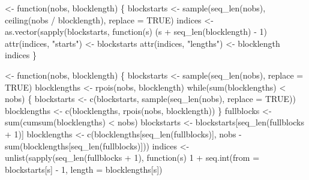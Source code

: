 \documentclass[10pt]{article}%
\begin{document}
 <- function(nobs, blocklength) \{
  blockstarts <- sample(seq_len(nobs), ceiling(nobs / blocklength), 
                        replace = TRUE)
  indices <- 
    as.vector(sapply(blockstarts, function(s)
                     (s + seq_len(blocklength) - 1) %
  attr(indices, "starts") <- blockstarts
  attr(indices, "lengths") <- blocklength
  indices
\}

 <- function(nobs, blocklength) \{
  blockstarts <- sample(seq_len(nobs), replace = TRUE) 
  blocklengths <- rpois(nobs, blocklength)
  while(sum(blocklengths) < nobs) \{
    blockstarts <- c(blockstarts, sample(seq_len(nobs), replace = TRUE))
    blocklengths <- c(blocklengths, rpois(nobs, blocklength))
  \}
  fullblocks <- sum(cumsum(blocklengths) < nobs)
  blockstarts <- blockstarts[seq_len(fullblocks + 1)]
  blocklengths <- c(blocklengths[seq_len(fullblocks)],
                    nobs - sum(blocklengths[seq_len(fullblocks)]))
  indices <- unlist(sapply(seq_len(fullblocks + 1), function(s)
                           1 + seq.int(from = blockstarts[s] - 1, 
                                       length = blocklengths[s]) %
  
\end{document}
